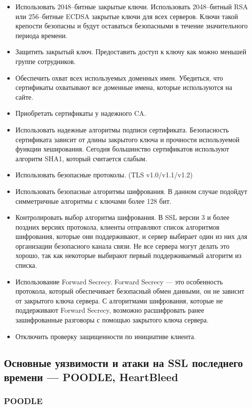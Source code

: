 \documentclass[utf8x, 12pt]{G7-32}
\begin{document}
\begin{itemize}
	\item Использовать 2048--битные закрытые ключи.
Использовать 2048--битный RSA или 256--битные ECDSA закрытые ключи для всех серверов. Ключи такой крепости безопасны и будут оставаться безопасными в течение значительного периода времени.
	\item Защитить закрытый ключ. Предоставить доступ к ключу как можно меньшей группе сотрудников.
	\item Обеспечить охват всех используемых доменных имен. Убедиться, что сертификаты охватывают все доменные имена, которые используются на сайте.
	\item Приобретать сертификаты у надежного CA.
	\item Использовать надежные алгоритмы подписи сертификата. Безопасность сертификата зависит от длины закрытого ключа и прочности используемой функции хеширования. Сегодня большинство сертификатов используют алгоритм SHA1, который считается слабым. 
	\item Использовать безопасные протоколы. (TLS v1.0/v1.1/v1.2)
	\item Использовать безопасные алгоритмы шифрования. В данном случае подойдут симметричные алгоритмы с ключами более 128 бит.
	\item Контролировать выбор алгоритма шифрования. В SSL версии 3 и более поздних версиях протокола, клиенты отправляют список алгоритмов шифрования, которые они поддерживают, и сервер выбирает один из них для организации безопасного канала связи. Не все сервера могут делать это хорошо, так как некоторые выбирают первый поддерживаемый алгоритм из списка.
	\item Использование Forward Secrecy. Forward Secrecy --- это особенность протокола, который обеспечивает безопасный обмен данными, он не зависит от закрытого ключа сервера. С алгоритмами шифрования, которые не поддерживают Forward Secrecy, возможно расшифровать ранее зашифрованные разговоры с помощью закрытого ключа сервера.
	\item Отключить проверку защищенности по инициативе клиента.
\end{itemize}


\newpage
\subsection{Основные уязвимости и атаки на SSL последнего времени --- POODLE, HeartBleed}

\subsubsection{POODLE}
\end{document}
